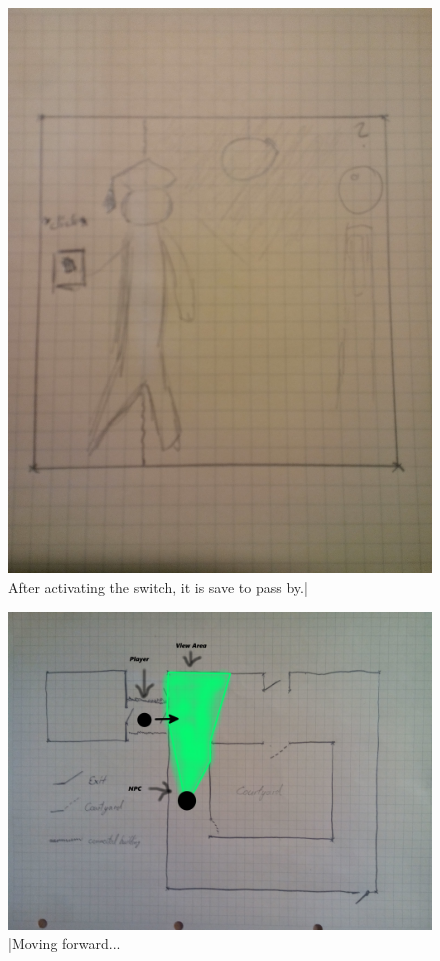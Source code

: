 \documentclass[12pt]{article}
\begin{document}
\begin{figure}[ht]
	\centering
	\includegraphics[width=1\linewidth]{Images/lightoff}
	\caption{After activating the switch, it is save to pass by.|}
\end{figure}
                    
\begin{figure}[ht]
	\centering
	\includegraphics[width=1\linewidth]{Images/movingintosightfield}
	\caption{|Moving forward...}
\end{figure}
\end{document}
